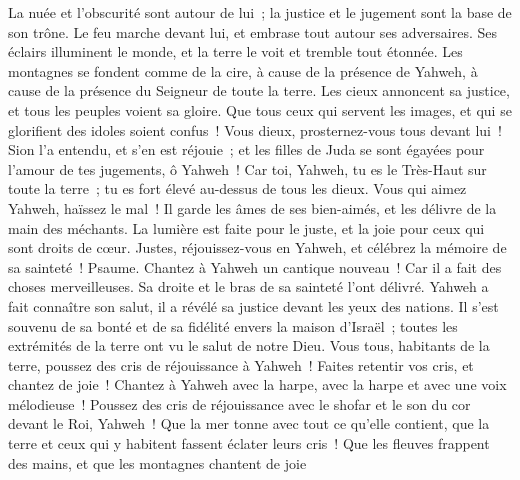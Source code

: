 \begin{multicols}{2}
La nuée et l'obscurité sont autour de lui~; la justice et le jugement sont la base de son trône.
Le feu marche devant lui, et embrase tout autour ses adversaires.
Ses éclairs illuminent le monde, et la terre le voit et tremble tout étonnée.
Les montagnes se fondent comme de la cire, à cause de la présence de Yahweh, à cause de la présence du Seigneur de toute la terre.
Les cieux annoncent sa justice, et tous les peuples voient sa gloire.
Que tous ceux qui servent les images, et qui se glorifient des idoles soient confus~! Vous dieux, prosternez-vous tous devant lui~!
Sion l'a entendu, et s'en est réjouie~; et les filles de Juda se sont égayées pour l'amour de tes jugements, ô Yahweh~!
Car toi, Yahweh, tu es le Très-Haut sur toute la terre~; tu es fort élevé au-dessus de tous les dieux.
Vous qui aimez Yahweh, haïssez le mal~! Il garde les âmes de ses bien-aimés, et les délivre de la main des méchants.
La lumière est faite pour le juste, et la joie pour ceux qui sont droits de cœur.
Justes, réjouissez-vous en Yahweh, et célébrez la mémoire de sa sainteté~!
\VerseOne{}Psaume. Chantez à Yahweh un cantique nouveau~! Car il a fait des choses merveilleuses. Sa droite et le bras de sa sainteté l'ont délivré.
Yahweh a fait connaître son salut, il a révélé sa justice devant les yeux des nations.
Il s'est souvenu de sa bonté et de sa fidélité envers la maison d'Israël~; toutes les extrémités de la terre ont vu le salut de notre Dieu.
Vous tous, habitants de la terre, poussez des cris de réjouissance à Yahweh~! Faites retentir vos cris, et chantez de joie~!
Chantez à Yahweh avec la harpe, avec la harpe et avec une voix mélodieuse~!
Poussez des cris de réjouissance avec le shofar et le son du cor devant le Roi, Yahweh~!
Que la mer tonne avec tout ce qu'elle contient, que la terre et ceux qui y habitent fassent éclater leurs cris~!
Que les fleuves frappent des mains, et que les montagnes chantent de joie

\end{multicols}
